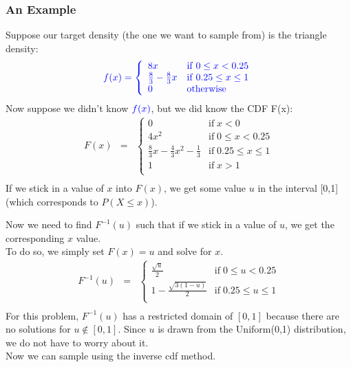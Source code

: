 \documentclass[handout]{beamer}
\begin{document}
\begin{frame}
\frametitle{An Example}
\pause
Suppose our target density (the one we want to sample from) is the triangle density:
\pause
\begin{eqnarray*}
\textcolor{blue}{f(x) = \left\lbrace \begin{array}{ll} 8x & \mathrm{if} \;
0 \le x < 0.25 \\
\frac{8}{3} - \frac{8}{3} x & \mathrm{if} \; 0.25 \le x \le 1 \\
0 & \mathrm{otherwise} \end{array} \right.}
\end{eqnarray*}
\pause
Now suppose we didn't know $\textcolor{blue}{f(x)}$, but we did know the CDF F(x):
\pause
\begin{eqnarray*}
F(x) &=& \left\lbrace \begin{array}{ll} 0 & \mathrm{if} \; x < 0 \\
4x^2 & \mathrm{if} \; 0 \le x < 0.25 \\
\frac{8}{3}x - \frac{4}{3}x^2 - \frac{1}{3} & \mathrm{if} \; 0.25 \le x \le 1 \\
1 & \mathrm{if} \; x > 1 \\
\end{array} \right.\\
\end{eqnarray*}
\pause
If we stick in a value of $x$ into $F(x)$, we get some value $u$ in
the interval [0,1] (which corresponds to $P(X \le x)$).
\end{frame}

\begin{frame}
Now we need to find $F^{-1}(u)$ such that if we stick in a value of
$u$, we get the corresponding $x$ value.\\
\pause
\bigskip
To do so, we simply set $F(x) = u$ and solve for $x$.
\pause
\begin{eqnarray*}
F^{-1}(u) &=& \left\lbrace \begin{array}{ll} \frac{\sqrt{u}}{2} & \mathrm{if} \; 0 \le u < 0.25 \\
1 - \frac{\sqrt{3(1-u)}}{2} & \mathrm{if} \; 0.25 \le u \le 1 \\
\end{array} \right.\\
\end{eqnarray*}
\pause
For this problem, $F^{-1}(u)$ has a restricted domain of $[0,1]$
because there are no solutions for $u \notin [0,1]$.  Since $u$
is drawn from the Uniform(0,1) distribution, we do not have to worry
about it.\\
\pause
\bigskip
Now we can sample using the inverse cdf method.
\end{frame}
\end{document}
